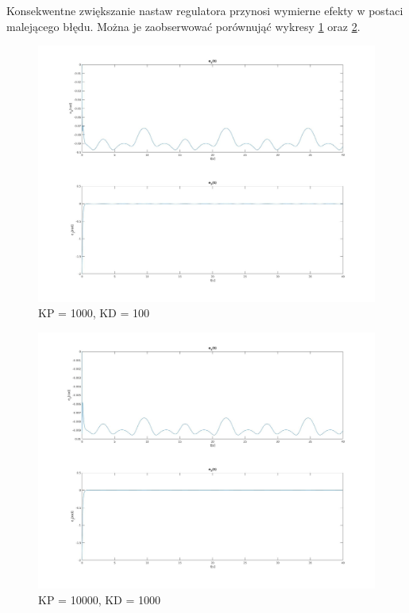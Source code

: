 \documentclass[12pt,a4paper]{article}
\begin{document}
    Konsekwentne zwiększanie nastaw regulatora przynosi wymierne efekty w postaci malejącego błędu. Można je zaobserwować porównująć wykresy \ref{fig:1000} oraz \ref{fig:10000}.

  \begin{figure}[H]
    \centering
    \includegraphics[height=0.4\textheight]{figures/qui1000.jpg}
    \caption{KP = 1000, KD = 100}
    \label{fig:1000}
  \end{figure}


  \begin{figure}[H]
    \centering
    \includegraphics[height=0.4\textheight]{figures/qui10000.jpg}
    \caption{KP = 10000, KD = 1000}
    \label{fig:10000}
  \end{figure}
\end{document}
